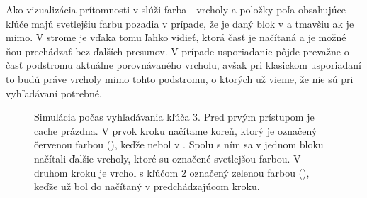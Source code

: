 Ako vizualizácia prítomnosti v \cache slúži farba - vrcholy a položky poľa obsahujúce kľúče majú svetlejšiu farbu pozadia v prípade, že je daný blok v \cache a tmavšiu ak je mimo. V strome je vďaka tomu ľahko vidieť, ktorá časť je načítaná a je možné ňou prechádzať bez ďalších presunov. V prípade \vEB usporiadanie pôjde prevažne o časť podstromu aktuálne porovnávaného vrcholu, avšak pri klasickom usporiadaní to budú práve vrcholy mimo tohto podstromu, o ktorých už vieme, že nie sú pri vyhľadávaní potrebné.

\begin{figure}
    \centering
    \hspace{1cm}
    \hspace{1cm}
    \caption[Simulácia \cache počas vyhľadávania kľúča]{Simulácia \cache počas vyhľadávania kľúča $3$. Pred prvým prístupom je cache prázdna. V prvok kroku načítame koreň, ktorý je označený červenou farbou (\miss), keďže nebol v \cache. Spolu s ním sa v jednom bloku načítali ďalšie vrcholy, ktoré su označené svetlejšou farbou. V druhom kroku je vrchol s kľúčom $2$ označený zelenou farbou (\hit), keďže už bol do \cache načítaný v predchádzajúcom kroku.}
    \label{fig:ss_cachesim_colors}
\end{figure}


